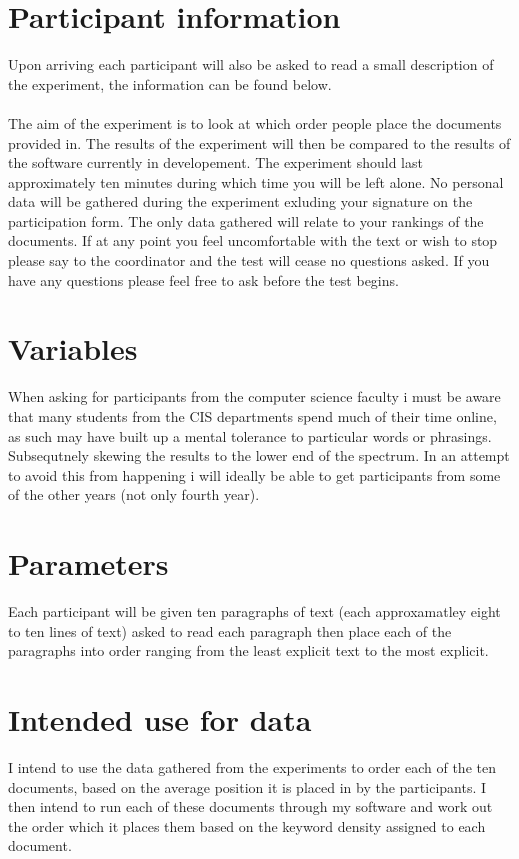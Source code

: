 \documentclass{article}
\begin{document}
\section*{Participant information}
Upon arriving each participant will also be asked to read a small description of the experiment, the information can be found below.
\\
\\
The aim of the experiment is to look at which order people place the documents provided in. The results of the experiment will then be compared to the results of the software currently in developement. The experiment should last approximately ten minutes during which time you will be left alone.  No personal data will be gathered during the experiment exluding your signature on the participation form. The only data gathered will relate to your rankings of the documents. If at any point you feel uncomfortable with the text or wish to stop please say to the coordinator and the test will cease no questions asked. If you have any questions please feel free to ask before the test begins.

\section*{Variables}
When asking for participants from the computer science faculty i must be aware that many students from the CIS departments spend much of their time online, as such may have built up a mental tolerance to particular words or phrasings. Subsequtnely skewing the results to the lower end of the spectrum. In an attempt to avoid this from happening i will ideally be able to get participants from some of the other years (not only fourth year).

\section*{Parameters}
Each participant will be given ten paragraphs of text (each approxamatley eight to ten lines of text) asked to read each paragraph then place each of the paragraphs into order ranging from the least explicit text to the most explicit.

\section*{Intended use for data}
I intend to use the data gathered from the experiments to order each of the ten documents, based on the average position it is placed in by the participants. I then intend to run each of these documents through my software and work out the order which it places them based on the keyword density assigned to each document.
\end{document}
